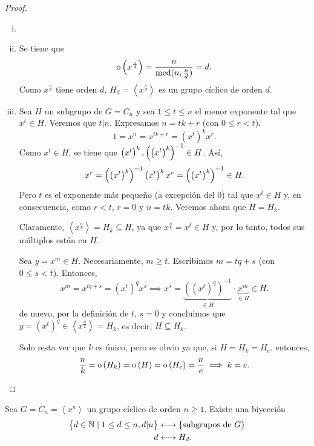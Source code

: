 \begin{proof}
    \begin{enumerate}[i)]
        \item[]
        \item Se tiene que
            \[
                \operatorname{o}\left( x^{\frac{n}{d}} \right) = \frac{n}{\operatorname{mcd}(n, \frac{n}{d})} = d.
            \]
            Como $x^{\frac{n}{d}}$ tiene orden $d$, $H_d = \left< x^{\frac{n}{d}} \right>$ es un grupo
            cíclico de orden $d$.
        \item Sea $H$ un subgrupo de $G = C_n$ y sea $1 \leq t \leq n$ el menor exponente tal que 
            $x^t \in H$. Veremos que $t \vert n$. Expresamos $n = tk + r$ (con $0 \leq r < t$).
            \[
                1 = x^n = x^{tk + r} = \left( x^t \right)^k x^r.
            \]
            Como $x^t\in H$, se tiene que $\left( x^t\right)^k, \left( \left( x^t\right)^k \right) ^{-1} \in H$. Así,
            \[
                x^r=\left( \left( x^t\right)^k \right) ^{-1} \left( x^t\right)^k x^r = \left( \left( x^t\right)^k \right) ^{-1} \in H.
            \]
            Pero $t$ es el exponente más pequeño (a excepción del 0) tal que $x^t\in H$ y, en consecuencia, como $r<t$, $r = 0$ y $n = tk$.
            Veremos ahora que $H = H_k$.
            
            Claramente, $\left< x^{\frac{n}{k}} \right> = H_k \subseteq H$, ya que $x^{\frac{n}{k}} = x^t \in H$
            y, por lo tanto, todos sus múltiplos están en $H$.

            Sea $y = x^m \in H$. Necesariamente, $m\geq t$. Escribimos $m = tq + s$
            (con $0 \leq s < t$). Entonces,
            \[
                x^m = x^{tq + s} = \left( x^t \right)^q x^s \implies
                x^s = \underbrace{\left( \left( x^t \right)^q \right)^{-1}}_{\in H} \cdot
                \underbrace{x^m}_{\in H} \in H.
            \]
            de nuevo, por la definición de $t$, $s = 0$ y concluimos que $y = \left( x^t \right)^q \in 
            \left< x^{\frac{n}{k}} \right> = H_k$, es decir, $H \subseteq H_k$.

            Solo resta ver que $k$ es único, pero es obvio ya que, si $H = H_k = H_e$, entonces,
            \[
                \frac{n}{k} = \operatorname{o}\left( H_k \right) = \operatorname{o}\left( H \right)  = \operatorname{o}\left( H_e \right)  = \frac{n}{e}\implies
                k = e.
            \]
    \end{enumerate}
\end{proof}

\begin{col}
    Sea $G = C_n = \left< x^n \right>$ un grupo cíclico de orden $n \geq 1$. Existe una biyección
    \[
        \begin{aligned}
            \left\{d \in \mathbb{N} \mid 1 \leq d \leq n, d \vert n \right\} &\longleftrightarrow
            \left\{\text{subgrupos de }G\right\} \\
            d &\longleftrightarrow H_d.
        \end{aligned}
    \]
\end{col}

